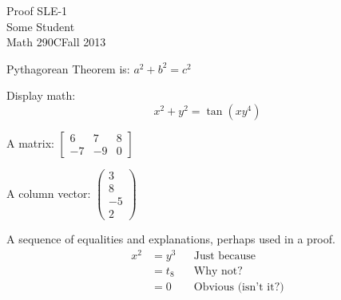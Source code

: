 \documentclass[12pt]{article}
\begin{document}
\begin{center}
{\Large Proof SLE-1}\\
Some Student\\
Math 290C\quad\quad Fall 2013
\end{center}


Pythagorean Theorem is: \(a^2 + b^2 = c^2\)

Display math: \[x^2+y^2=\tan(xy^4)\]

A matrix:
\(\begin{bmatrix}
6 & 7 & 8\\
-7 & -9 & 0
\end{bmatrix}\)

A column vector:
\(\begin{pmatrix}
3\\
8\\
-5\\
2
\end{pmatrix}\)

A sequence of equalities and explanations, perhaps used in a proof.
\begin{align*}
x^2 &= y^3 && \text{Just because}\\
&= t_8 && \text{Why not?}\\
&= 0 && \text{Obvious (isn't it?)}
\end{align*}
\end{document}
